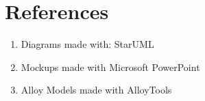 \section{References}
\label{sec:ref}

\begin{enumerate}
    \item Diagrams made with: StarUML
    \item Mockups made with Microsoft PowerPoint
    \item Alloy Models made with AlloyTools
\end{enumerate}